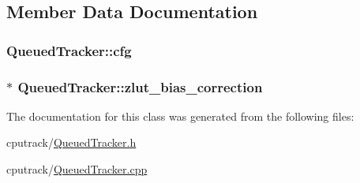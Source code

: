 \subsection{Member Data Documentation}
\subsubsection[{\texorpdfstring{cfg}{cfg}}]{ Queued\+Tracker\+::cfg}\hypertarget{class_queued_tracker_afb847e7f49e0af6027d58af51d5914dc}{}\label{class_queued_tracker_afb847e7f49e0af6027d58af51d5914dc}
\subsubsection[{\texorpdfstring{zlut\+\_\+bias\+\_\+correction}{zlut_bias_correction}}]{$\ast$ Queued\+Tracker\+::zlut\+\_\+bias\+\_\+correction\hspace{0.3cm}{\ttfamily [protected]}}\hypertarget{class_queued_tracker_a6f5a5a506c622ee1c174cd497c5152b9}{}\label{class_queued_tracker_a6f5a5a506c622ee1c174cd497c5152b9}


The documentation for this class was generated from the following files\+:\begin{DoxyCompactItemize}
\item 
cputrack/\hyperlink{_queued_tracker_8h}{Queued\+Tracker.\+h}\item 
cputrack/\hyperlink{_queued_tracker_8cpp}{Queued\+Tracker.\+cpp}\end{DoxyCompactItemize}
